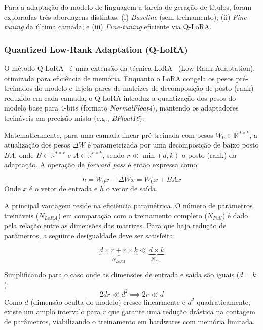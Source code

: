 

Para a adaptação do modelo de linguagem à tarefa de geração de títulos, foram exploradas três abordagens distintas: (i) \textit{Baseline} (sem treinamento); (ii) \textit{Fine-tuning} da última camada; e (iii) \textit{Fine-tuning} eficiente via Q-LoRA.

\subsubsection{Quantized Low-Rank Adaptation (Q-LoRA)}

O método Q-LoRA~\cite{dettmers_qlora_nodate} é uma extensão da técnica LoRA~\cite{hu_lora_2022} (Low-Rank Adaptation), otimizada para eficiência de memória. Enquanto o LoRA congela os pesos pré-treinados do modelo e injeta pares de matrizes de decomposição de posto (rank) reduzido em cada camada, o Q-LoRA introduz a quantização dos pesos do modelo base para 4-bits (formato \textit{NormalFloat4}), mantendo os adaptadores treináveis em precisão mista (e.g., \textit{BFloat16}).

Matematicamente, para uma camada linear pré-treinada com pesos $W_0 \in \mathbb{R}^{d \times k}$, a atualização dos pesos $\Delta W$ é parametrizada por uma decomposição de baixo posto $BA$, onde $B \in \mathbb{R}^{d \times r}$ e $A \in \mathbb{R}^{r \times k}$, sendo $r \ll \min(d, k)$ o posto (rank) da adaptação. A operação de \textit{forward pass} é então expressa como:

\begin{equation}
h = W_0 x + \Delta W x = W_0 x + B A x
\end{equation}
Onde $x$ é o vetor de entrada e $h$ o vetor de saída.

A principal vantagem reside na eficiência paramétrica. O número de parâmetros treináveis ($N_{LoRA}$) em comparação com o treinamento completo ($N_{Full}$) é dado pela relação entre as dimensões das matrizes. Para que haja redução de parâmetros, a seguinte desigualdade deve ser satisfeita:

\begin{equation}
    \underbrace{d \times r + r \times k}_{N_{LoRA}} \ll \underbrace{d \times k}_{N_{Full}}
\end{equation}

Simplificando para o caso onde as dimensões de entrada e saída são iguais ($d=k$):\begin{equation}2dr \ll d^2 \implies 2r \ll d\end{equation}Como $d$ (dimensão oculta do modelo) cresce linearmente e $d^2$ quadraticamente, existe um amplo intervalo para $r$ que garante uma redução drástica na contagem de parâmetros, viabilizando o treinamento em hardwares com memória limitada.

